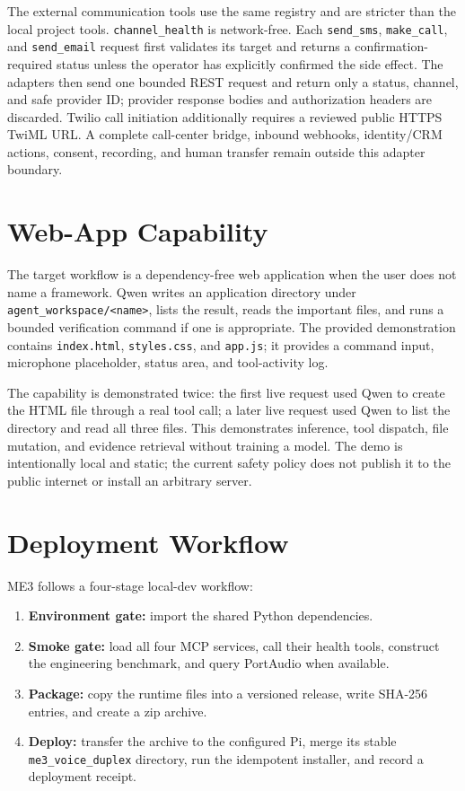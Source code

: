 \documentclass[sigconf,nonacm]{acmart}
\begin{document}
The external communication tools use the same registry and are stricter than
the local project tools. \texttt{channel\_health} is network-free. Each
\texttt{send\_sms}, \texttt{make\_call}, and \texttt{send\_email} request first
validates its target and returns a confirmation-required status unless the
operator has explicitly confirmed the side effect. The adapters then send one
bounded REST request and return only a status, channel, and safe provider ID;
provider response bodies and authorization headers are discarded. Twilio call
initiation additionally requires a reviewed public HTTPS TwiML URL. A complete
call-center bridge, inbound webhooks, identity/CRM actions, consent, recording,
and human transfer remain outside this adapter boundary.

\section{Web-App Capability}

The target workflow is a dependency-free web application when the user does not
name a framework. Qwen writes an application directory under
\texttt{agent\_workspace/<name>}, lists the result, reads the important files,
and runs a bounded verification command if one is appropriate. The provided
demonstration contains \texttt{index.html}, \texttt{styles.css}, and
\texttt{app.js}; it provides a command input, microphone placeholder, status
area, and tool-activity log.

The capability is demonstrated twice: the first live request used Qwen to
create the HTML file through a real tool call; a later live request used Qwen
to list the directory and read all three files. This demonstrates inference,
tool dispatch, file mutation, and evidence retrieval without training a model.
The demo is intentionally local and static; the current safety policy does not
publish it to the public internet or install an arbitrary server.

\section{Deployment Workflow}

ME3 follows a four-stage local-dev workflow:
\begin{enumerate}[leftmargin=*]
\item \textbf{Environment gate:} import the shared Python dependencies.
\item \textbf{Smoke gate:} load all four MCP services, call their health tools,
construct the engineering benchmark, and query PortAudio when available.
\item \textbf{Package:} copy the runtime files into a versioned release, write
SHA-256 entries, and create a zip archive.
\item \textbf{Deploy:} transfer the archive to the configured Pi, merge its
stable \texttt{me3\_voice\_duplex} directory, run the idempotent installer,
and record a deployment receipt.
\end{enumerate}
\end{document}
